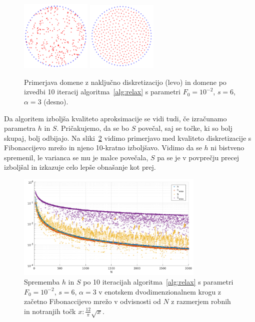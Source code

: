 \documentclass[12pt,a4paper]{article}
\theoremstyle{definition} %
\theoremstyle{plain} %
\begin{document}
\begin{figure}[!ht]
  \centering
  \includegraphics[width=0.3\textwidth]{images/domain_circle.png}
  \hspace{1em}
  \includegraphics[width=0.3\textwidth]{images/domain_circle_relaxed.png}
  \caption{Primerjava domene z naključno diskretizacijo (levo) in domene po
  izvedbi 10 iteracij algoritma~\ref{alg:relax} s parametri $F_0 = 10^{-2}$, $s
  = 6$, $\alpha = 3$ (desno).}
  \label{fig:relax-circle}
\end{figure}

Da algoritem izboljša kvaliteto aproksimacije se vidi tudi, če izračunamo
parametra $h$ in $S$. Pričakujemo, da se bo $S$ povečal, saj se točke, ki so
bolj skupaj, bolj odbijajo. Na sliki~\ref{fig:relax-hs} vidimo primerjavo med
kvaliteto diskretizacije s Fibonaccijevo mrežo in njeno 10-kratno izboljšavo.
Vidimo da se $h$ ni bistveno spremenil, le varianca se mu je malce povečala,
$S$ pa se je v povprečju precej izboljšal in izkazuje celo lepše obnašanje kot
prej.

\begin{figure}[ht]
  \centering
  \includegraphics[width=0.8\textwidth]{images/relax_improvement.png}
  \caption{Sprememba $h$ in $S$ po 10 iteracijah algoritma~\ref{alg:relax} s
  parametri $F_0 = 10^{-2}$, $s = 6$, $\alpha = 3$ v enotskem dvodimenzionalnem
  krogu z začetno Fibonaccijevo mrežo v odvisnosti od $N$ z razmerjem robnih in
  notranjih točk $x : \frac{12}{\pi} \sqrt{x}$.}
  \label{fig:relax-hs}
\end{figure}
\end{document}
